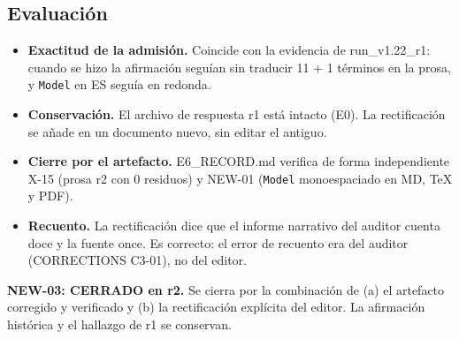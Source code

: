 \documentclass[
]{article}
\providecommand{\tightlist}{%
  \setlength{\itemsep}{0pt}\setlength{\parskip}{0pt}}
\begin{document}
\subsection{Evaluación}\label{evaluaciuxf3n}

\begin{itemize}
\tightlist
\item
  \textbf{Exactitud de la admisión.} Coincide con la evidencia de
  run\_v1.22\_r1: cuando se hizo la afirmación seguían sin traducir 11 +
  1 términos en la prosa, y \texttt{Model} en ES seguía en redonda.
\item
  \textbf{Conservación.} El archivo de respuesta r1 está intacto (E0).
  La rectificación se añade en un documento nuevo, sin editar el
  antiguo.
\item
  \textbf{Cierre por el artefacto.} E6\_RECORD.md verifica de forma
  independiente X-15 (prosa r2 con 0 residuos) y NEW-01 (\texttt{Model}
  monoespaciado en MD, TeX y PDF).
\item
  \textbf{Recuento.} La rectificación dice que el informe narrativo del
  auditor cuenta doce y la fuente once. Es correcto: el error de
  recuento era del auditor (CORRECTIONS C3-01), no del editor.
\end{itemize}

\textbf{NEW-03: CERRADO en r2.} Se cierra por la combinación de (a) el
artefacto corregido y verificado y (b) la rectificación explícita del
editor. La afirmación histórica y el hallazgo de r1 se conservan.
\end{document}
